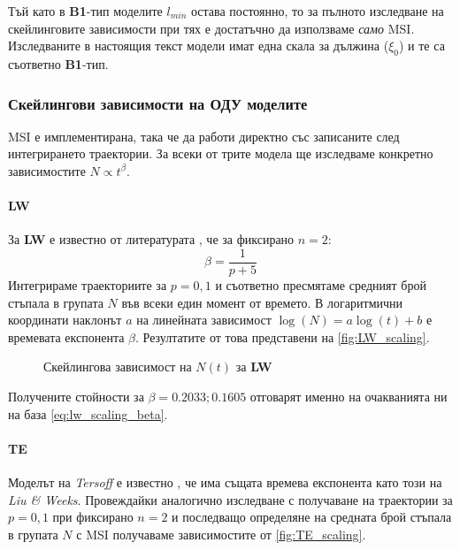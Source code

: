Тъй като в \textbf{B1}-тип моделите $l_{min}$ остава постоянно, то за пълното изследване на скейлинговите зависимости при тях е достатъчно да използваме \textit{само} MSI. Изследваните в настоящия текст модели имат една скала за дължина ($\xi_0$) \cite{Staneva2010} и те са съответно \textbf{B1}-тип.

\subsubsection{Скейлингови зависимости на ОДУ моделите}
MSI е имплементирана, така че да работи директно със записаните след интегрирането траектории. За всеки от трите модела ще изследваме конкретно зависимостите $N \propto t^\beta$. 

\paragraph{LW} За \textbf{LW} е известно от литературата \cite{Liu1998} \cite{Krasteva2016}, че за фиксирано $n = 2$:
\begin{equation}
    \beta = \frac{1}{p+5}
    \label{eq:lw_scaling_beta}
\end{equation} 
Интегрираме траекториите за $p = 0, 1$ и съответно пресмятаме средният брой стъпала в групата $N$ във всеки един момент от времето. В логаритмични координати наклонът $a$ на линейната зависимост $\log(N) = a \log(t) + b$ е времевата експонента $\beta$. Резултатите от това представени на \autoref{fig:LW_scaling}.
\begin{figure}[hbpt]
    \centering
    \caption{Скейлингова зависимост на $N(t)$ за \textbf{LW}}
    \label{fig:LW_scaling}
\end{figure}
Получените стойности за $\beta = 0.2033; 0.1605$ отговарят именно на очакванията ни на база \autoref{eq:lw_scaling_beta}.

\paragraph{TE} Моделът на \textit{Tersoff} е известно \cite{Krasteva2016}, че има същата времева експонента като този на \textit{Liu \& Weeks}. Провеждайки аналогично изследване с получаване на траектории за $p = 0, 1$ при фиксирано $n =  2$ и последващо определяне на средната брой стъпала в групата $N$ с MSI получаваме зависимостите от \autoref{fig:TE_scaling}. 

